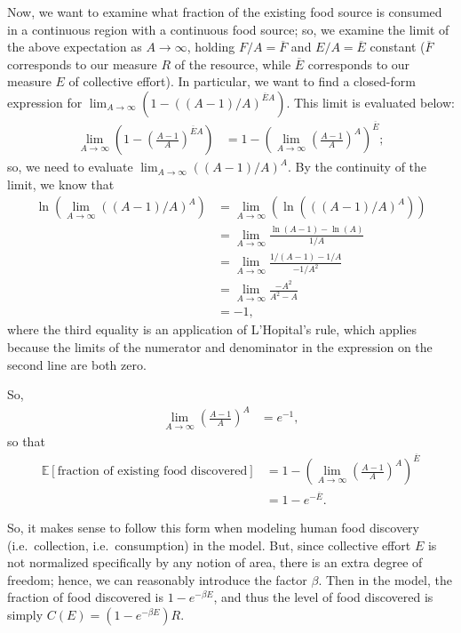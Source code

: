 \documentclass[12pt,reqno]{amsart}
\begin{document}
Now, we want to examine what fraction of the existing food source is consumed in a continuous region with a continuous food source; so, we examine the limit of the above expectation as $A \rightarrow \infty$, holding $F/A = \overline{F}$ and $E/A = \overline{E}$ constant ($\overline{F}$ corresponds to our measure $R$ of the resource, while $\overline{E}$ corresponds to our measure $E$ of collective effort). In particular, we want to find a closed-form expression for $\lim_{A \rightarrow \infty} (1-((A-1)/A)^{\overline{E}A})$. This limit is evaluated below:
\begin{align*} \label{}
\lim_{A\rightarrow\infty} \left(1 - \left(\frac{A-1}{A}\right)^{\overline{E}A}\right) &= 1 - \left(\lim_{A\rightarrow\infty} \left(\frac{A-1}{A}\right)^A\right)^{\overline{E}};
\end{align*}
so, we need to evaluate $\lim_{A\rightarrow\infty} ((A-1)/A)^A$. By the continuity of the limit, we know that
\begin{align*} \label{}
\ln\left(\lim_{A\rightarrow\infty} ((A-1)/A)^A\right) &= \lim_{A\rightarrow\infty}\left(\ln\left(((A-1)/A)^A\right)\right) \\
									&= \lim_{A\rightarrow\infty}\frac{\ln(A-1) - \ln(A)}{1/A} \\
									&= \lim_{A\rightarrow\infty}\frac{1/(A-1) - 1/A}{-1/A^2} \\
									&= \lim_{A\rightarrow\infty}\frac{-A^2}{A^2 - A} \\
									&= -1,
\end{align*}
where the third equality is an application of L'Hopital's rule, which applies because the limits of the numerator and denominator in the expression on the second line are both zero.

So,
\begin{align*} \label{}
\lim_{A\rightarrow\infty} \left(\frac{A-1}{A}\right)^A &= e^{-1},
\end{align*}
so that
\begin{align*} \label{}
\mathbb{E}[\textrm{fraction of existing food discovered}] &= 1 - \left(\lim_{A\rightarrow\infty} \left(\frac{A-1}{A}\right)^A\right)^{\overline{E}} \\
										     &= 1 - e^{-\overline{E}}.
\end{align*}

So, it makes sense to follow this form when modeling human food discovery (i.e.\ collection, i.e.\ consumption) in the model. But, since collective effort $E$ is not normalized specifically by any notion of area, there is an extra degree of freedom; hence, we can reasonably introduce the factor $\beta$. Then in the model, the fraction of food discovered is $1 - e^{-\beta E}$, and thus the level of food discovered is simply $C(E) = (1 - e^{-\beta E})R$.







%
%
\end{document}
